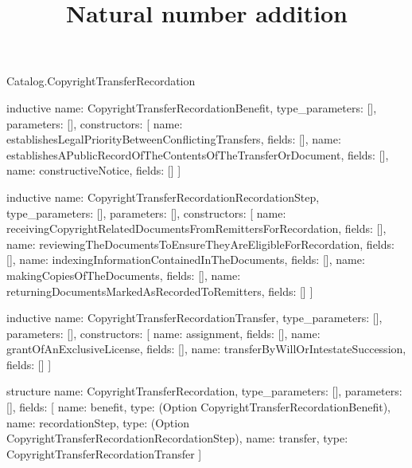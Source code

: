 \begin{lexlean}{Catalog.CopyrightTransferRecordation}
\title{Natural number addition}
\begin{semanticmodule}
inductive{
  name: CopyrightTransferRecordationBenefit,
  type_parameters: [],
  parameters: [],
  constructors: [
    {name: establishesLegalPriorityBetweenConflictingTransfers, fields: []},
    {name: establishesAPublicRecordOfTheContentsOfTheTransferOrDocument, fields: []},
    {name: constructiveNotice, fields: []}
  ]
}

inductive{
  name: CopyrightTransferRecordationRecordationStep,
  type_parameters: [],
  parameters: [],
  constructors: [
    {name: receivingCopyrightRelatedDocumentsFromRemittersForRecordation, fields: []},
    {name: reviewingTheDocumentsToEnsureTheyAreEligibleForRecordation, fields: []},
    {name: indexingInformationContainedInTheDocuments, fields: []},
    {name: makingCopiesOfTheDocuments, fields: []},
    {name: returningDocumentsMarkedAsRecordedToRemitters, fields: []}
  ]
}

inductive{
  name: CopyrightTransferRecordationTransfer,
  type_parameters: [],
  parameters: [],
  constructors: [
    {name: assignment, fields: []},
    {name: grantOfAnExclusiveLicense, fields: []},
    {name: transferByWillOrIntestateSuccession, fields: []}
  ]
}

structure{
  name: CopyrightTransferRecordation,
  type_parameters: [],
  parameters: [],
  fields: [
    {name: benefit, type: (Option CopyrightTransferRecordationBenefit)},
    {name: recordationStep, type: (Option CopyrightTransferRecordationRecordationStep)},
    {name: transfer, type: CopyrightTransferRecordationTransfer}
  ]
}
\end{semanticmodule}
\end{lexlean}
